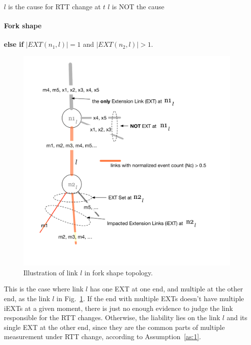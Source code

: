 \begin{algorithmic}
\State $l$ is the cause for RTT change at $t$ 
\Else
\State $l$ is NOT the cause
\EndIf
\end{algorithmic}


\paragraph{Fork shape} \textbf{else if} $|EXT(n_1, l)| = 1$ and  $|EXT(n_2, l)| > 1$.

\begin{figure}[!htb]
\centering
\includegraphics[width=.9\textwidth]{gfx/chap5/fork_shape.pdf}
\caption{Illustration of link $l$ in fork shape topology.}
\label{fig:chap5_fork_shape}
\end{figure}

This is the case where link $l$ has one \ac{EXT} at one end, and multiple at the other end, as the link $l$ in Fig.~\ref{fig:chap5_fork_shape}. If the end with multiple \acp{EXT} doesn't have multiple \acp{iEXT} at a given moment, there is just no enough evidence to judge the link responsible for the RTT changes. Otherwise, the liability lies on the link $l$ and its single \ac{EXT} at the other end, since they are the common parts of multiple measurement under RTT change, according to Assumption~\ref{as:1}.

